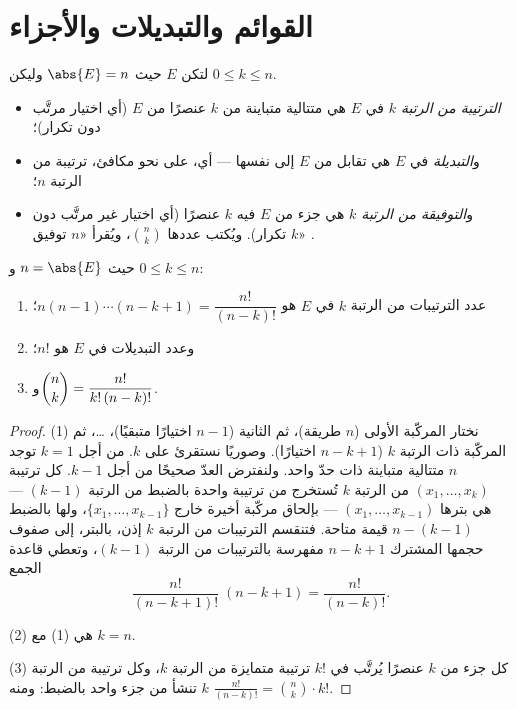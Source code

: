 \section{القوائم والتبديلات والأجزاء}

\begin{definition}\label{def:b1:counting:objects}
لتكن $E$  حيث $\abs{E} = n$ وليكن $0 \leq k \leq n$.
\begin{itemize}
  \item \emph{الترتيبة من الرتبة $k$} في $E$ هي متتالية 
        متباينة من $k$ عنصرًا من $E$ (أي اختيار مرتَّب دون تكرار)؛
  \item و\emph{التبديلة} في $E$ هي تقابل من $E$
        إلى نفسها --- أي، على نحو مكافئ، ترتيبة من الرتبة $n$؛
  \item و\emph{التوفيقة من الرتبة $k$} هي جزء من $E$ فيه $k$
        عنصرًا (أي اختيار غير مرتَّب دون تكرار). ويُكتب عددها
        $\binom{n}{k}$، ويُقرأ «$n$ توفيق $k$»
        .
\end{itemize}
\end{definition}

\begin{theorem}\label{thm:b1:counting:counts}
حيث $n = \abs{E}$ و $0 \leq k \leq n$:
\begin{enumerate}
  \item عدد الترتيبات من الرتبة $k$ في $E$ هو $n (n-1) \cdots
        (n-k+1) = \dfrac{n!}{(n-k)!}$؛
  \item وعدد التبديلات في $E$ هو $n!$؛
  \item و$\dbinom{n}{k} = \dfrac{n!}{k!\,(n-k)!}$.
\end{enumerate}
\end{theorem}

\begin{proof}
(1) نختار المركّبة الأولى ($n$ طريقة)، ثم الثانية ($n - 1$
اختيارًا متبقيًا)، \dots، ثم المركّبة ذات الرتبة $k$ ($n - k + 1$
اختيارًا). وصوريًا نستقرئ على $k$. من أجل $k = 1$ توجد $n$
متتالية متباينة ذات حدّ واحد. ولنفترض العدّ صحيحًا من أجل $k - 1$.
كل ترتيبة $(x_1, \dots, x_k)$ من الرتبة $k$ تُستخرج من ترتيبة
واحدة بالضبط من الرتبة $(k-1)$ --- هي بترها $(x_1, \dots, x_{k-1})$
--- بإلحاق مركّبة أخيرة خارج $\{x_1, \dots,
x_{k-1}\}$، ولها بالضبط $n - (k - 1)$ قيمة متاحة.
فتنقسم الترتيبات من الرتبة $k$ إذن، بالبتر، إلى صفوف حجمها
المشترك $n - k + 1$ مفهرسة بالترتيبات من الرتبة $(k-1)$، وتعطي
قاعدة الجمع
\[
\frac{n!}{(n-k+1)!}\;(n - k + 1) = \frac{n!}{(n-k)!} .
\]

(2) هي (1) مع $k = n$.

(3) كل جزء من $k$ عنصرًا يُرتَّب في $k!$ ترتيبة متمايزة من الرتبة
$k$، وكل ترتيبة من الرتبة $k$ تنشأ من جزء واحد بالضبط: ومنه
$\frac{n!}{(n-k)!} = \binom nk \cdot k!$.
\end{proof}

